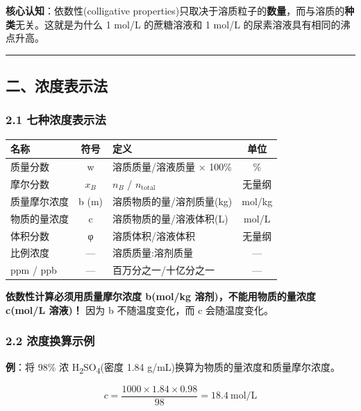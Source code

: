 \textbf{核心认知}：依数性(colligative properties)只取决于溶质粒子的\textbf{数量}，而与溶质的\textbf{种类}无关。这就是为什么 1 mol/L 的蔗糖溶液和 1 mol/L 的尿素溶液具有相同的沸点升高。

\begin{center}\rule{0.5\linewidth}{0.5pt}\end{center}

\subsection{二、浓度表示法}\label{ux4e8cux6d53ux5ea6ux8868ux793aux6cd5}

\subsubsection{2.1 七种浓度表示法}\label{ux4e03ux79cdux6d53ux5ea6ux8868ux793aux6cd5}

{\def\LTcaptype{none} %
\begin{longtable}[]{@{}lclc@{}}
\toprule\noalign{}
名称 & 符号 & 定义 & 单位 \\
\midrule\noalign{}
\endhead
\bottomrule\noalign{}
\endlastfoot
质量分数 & w & 溶质质量/溶液质量 × 100\% & \% \\
摩尔分数 & \(x_B\) & \(n_B\) / \(n_{\text{total}}\) & 无量纲 \\
质量摩尔浓度 & b (m) & 溶质物质的量/溶剂质量(kg) & mol/kg \\
物质的量浓度 & c & 溶质物质的量/溶液体积(L) & mol/L \\
体积分数 & φ & 溶质体积/溶液体积 & 无量纲 \\
比例浓度 & --- & 溶质质量:溶剂质量 & --- \\
ppm / ppb & --- & 百万分之一/十亿分之一 & --- \\
\end{longtable}
}

\textbf{依数性计算必须用质量摩尔浓度 b(mol/kg 溶剂)，不能用物质的量浓度 c(mol/L 溶液)！} 因为 b 不随温度变化，而 c 会随温度变化。

\subsubsection{2.2 浓度换算示例}\label{ux6d53ux5ea6ux6362ux7b97ux793aux4f8b}

\textbf{例}：将 98\% 浓 H\textsubscript{2}SO\textsubscript{4}(密度 1.84 g/mL)换算为物质的量浓度和质量摩尔浓度。

\[
c = \frac{1000 \times 1.84 \times 0.98}{98} = 18.4\ \mathrm{mol/L}
\]

